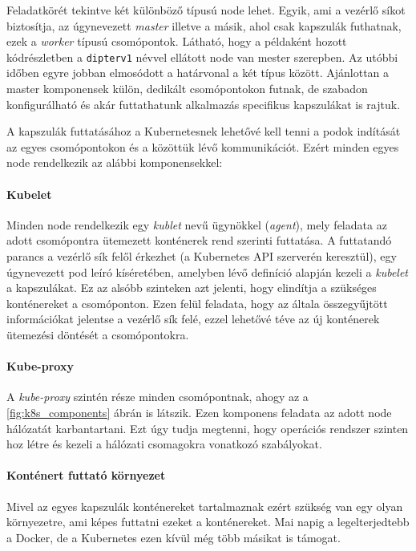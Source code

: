 Feladatkörét tekintve két különböző típusú node lehet.
Egyik, ami a vezérlő síkot biztosítja, az úgynevezett \textit{master} illetve a másik, ahol csak kapszulák futhatnak, ezek a \textit{worker} típusú csomópontok.
Látható, hogy a példaként hozott kódrészletben a \verb+dipterv1+ névvel ellátott node van mester szerepben.
Az utóbbi időben egyre jobban elmosódott a határvonal a két típus között.
Ajánlottan a master komponensek külön, dedikált csomópontokon futnak, de szabadon konfigurálható és akár futtathatunk alkalmazás specifikus kapszulákat is rajtuk.\\

\lstset{caption=Később használt klaszter csomópontjai, label=k8s_nodes}


A kapszulák futtatásához a Kubernetesnek lehetővé kell tenni a podok indítását az egyes csomópontokon és a közöttük lévő kommunikációt. 
Ezért minden egyes node rendelkezik az alábbi komponensekkel:

\paragraph{Kubelet} Minden node rendelkezik egy \textit{kublet} nevű ügynökkel (\textit{agent}), mely feladata az adott csomópontra ütemezett konténerek rend szerinti futtatása. 
A futtatandó parancs a vezérlő sík felől érkezhet (a Kubernetes API szerverén keresztül), egy úgynevezett pod leíró kíséretében, amelyben lévő definíció alapján kezeli a \textit{kubelet} a kapszulákat. Ez az alsóbb szinteken azt jelenti, hogy elindítja a szükséges konténereket a csomóponton.
Ezen felül feladata, hogy az általa összegyűjtött információkat jelentse a vezérlő sík felé, ezzel lehetővé téve az új konténerek ütemezési döntését a csomópontokra. 

\paragraph{Kube-proxy} A \textit{kube-proxy} szintén része minden csomópontnak, ahogy az a \ref{fig:k8s_components} ábrán is látszik. 
Ezen komponens feladata az adott node hálózatát karbantartani.
Ezt úgy tudja megtenni, hogy operációs rendszer szinten hoz létre és kezeli a hálózati csomagokra vonatkozó szabályokat.

\paragraph{Konténert futtató környezet} Mivel az egyes kapszulák konténereket tartalmaznak ezért szükség van egy olyan környezetre, ami képes futtatni ezeket a konténereket.
Mai napig a legelterjedtebb a Docker, de a Kubernetes ezen kívül még több másikat is támogat. 

